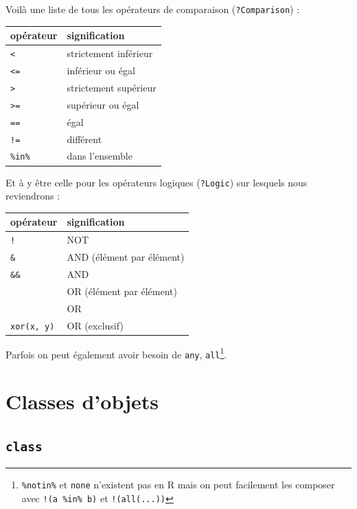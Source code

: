 \documentclass[
  letterpaper,
  DIV=11,
  numbers=noendperiod]{scrreprt}
\begin{document}
Voilà une liste de tous les opérateurs de comparaison
(\texttt{?Comparison}) :

\begin{longtable}[]{@{}ll@{}}
\toprule\noalign{}
opérateur & signification \\
\midrule\noalign{}
\endhead
\bottomrule\noalign{}
\endlastfoot
\texttt{\textless{}} & strictement inférieur \\
\texttt{\textless{}=} & inférieur ou égal \\
\texttt{\textgreater{}} & strictement supérieur \\
\texttt{\textgreater{}=} & supérieur ou égal \\
\texttt{==} & égal \\
\texttt{!=} & différent \\
\texttt{\%in\%} & dans l'ensemble \\
\end{longtable}

Et à y être celle pour les opérateurs logiques (\texttt{?Logic}) sur
lesquels nous reviendrons :

\begin{longtable}[]{@{}ll@{}}
\toprule\noalign{}
opérateur & signification \\
\midrule\noalign{}
\endhead
\bottomrule\noalign{}
\endlastfoot
\texttt{!} & NOT \\
\texttt{\&} & AND (élément par élément) \\
\texttt{\&\&} & AND \\
\texttt{\textbar{}} & OR (élément par élément) \\
\texttt{\textbar{}\textbar{}} & OR \\
\texttt{xor(x,\ y)} & OR (exclusif) \\
\end{longtable}

Parfois on peut également avoir besoin de \texttt{any},
\texttt{all}\footnote{\texttt{\%notin\%} et \texttt{none} n'existent pas
  en R mais on peut facilement les composer avec
  \texttt{!(a\ \%in\%\ b)} et \texttt{!(all(...))}}.

\hypertarget{classes-dobjets}{%
\section{Classes d'objets}\label{classes-dobjets}}

\hypertarget{class}{%
\subsection{\texorpdfstring{\texttt{class}}{class}}\label{class}}
\end{document}
